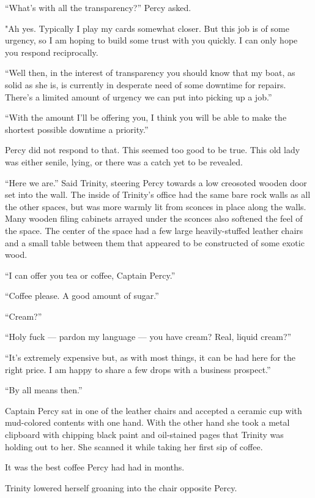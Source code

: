 \documentclass[]{scrbook}
\begin{document}
``What's with all the transparency?'' Percy asked.

"Ah yes. Typically I play my cards somewhat closer. But this job is of
some urgency, so I am hoping to build some trust with you quickly. I can
only hope you respond reciprocally.

``Well then, in the interest of transparency you should know that my
boat, as solid as she is, is currently in desperate need of some
downtime for repairs. There's a limited amount of urgency we can put
into picking up a job.''

``With the amount I'll be offering you, I think you will be able to make
the shortest possible downtime a priority.''

Percy did not respond to that. This seemed too good to be true. This old
lady was either senile, lying, or there was a catch yet to be revealed.

``Here we are.'' Said Trinity, steering Percy towards a low creosoted
wooden door set into the wall. The inside of Trinity's office had the
same bare rock walls as all the other spaces, but was more warmly lit
from sconces in place along the walls. Many wooden filing cabinets
arrayed under the sconces also softened the feel of the space. The
center of the space had a few large heavily-stuffed leather chairs and a
small table between them that appeared to be constructed of some exotic
wood.

``I can offer you tea or coffee, Captain Percy.''

``Coffee please. A good amount of sugar.''

``Cream?''

``Holy fuck --- pardon my language --- you have cream? Real, liquid
cream?''

``It's extremely expensive but, as with most things, it can be had here
for the right price. I am happy to share a few drops with a business
prospect.''

``By all means then.''

Captain Percy sat in one of the leather chairs and accepted a ceramic
cup with mud-colored contents with one hand. With the other hand she
took a metal clipboard with chipping black paint and oil-stained pages
that Trinity was holding out to her. She scanned it while taking her
first sip of coffee.

It was the best coffee Percy had had in months.

Trinity lowered herself groaning into the chair opposite Percy.
\end{document}
